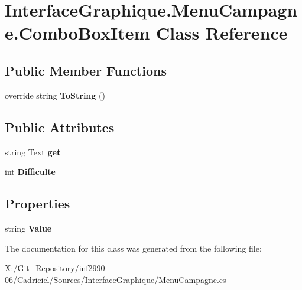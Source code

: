 \hypertarget{class_interface_graphique_1_1_menu_campagne_1_1_combo_box_item}{\section{Interface\-Graphique.\-Menu\-Campagne.\-Combo\-Box\-Item Class Reference}
\label{class_interface_graphique_1_1_menu_campagne_1_1_combo_box_item}
}
\subsection*{Public Member Functions}
\begin{DoxyCompactItemize}
\item 
\hypertarget{class_interface_graphique_1_1_menu_campagne_1_1_combo_box_item_ae18b58ca549af71043b57edffd6cfa6f}{override string {\bfseries To\-String} ()}\label{class_interface_graphique_1_1_menu_campagne_1_1_combo_box_item_ae18b58ca549af71043b57edffd6cfa6f}

\end{DoxyCompactItemize}
\subsection*{Public Attributes}
\begin{DoxyCompactItemize}
\item 
\hypertarget{class_interface_graphique_1_1_menu_campagne_1_1_combo_box_item_a6ca0abfd516a8df4faf602c9303319ea}{string Text {\bfseries get}}\label{class_interface_graphique_1_1_menu_campagne_1_1_combo_box_item_a6ca0abfd516a8df4faf602c9303319ea}

\item 
\hypertarget{class_interface_graphique_1_1_menu_campagne_1_1_combo_box_item_a044d419a44ff271f53a7e7f006064f4c}{int {\bfseries Difficulte}}\label{class_interface_graphique_1_1_menu_campagne_1_1_combo_box_item_a044d419a44ff271f53a7e7f006064f4c}

\end{DoxyCompactItemize}
\subsection*{Properties}
\begin{DoxyCompactItemize}
\item 
\hypertarget{class_interface_graphique_1_1_menu_campagne_1_1_combo_box_item_af32e2bf5eed166e54ce322627482cbff}{string {\bfseries Value}}\label{class_interface_graphique_1_1_menu_campagne_1_1_combo_box_item_af32e2bf5eed166e54ce322627482cbff}

\end{DoxyCompactItemize}


The documentation for this class was generated from the following file\-:\begin{DoxyCompactItemize}
\item 
X\-:/\-Git\-\_\-\-Repository/inf2990-\/06/\-Cadriciel/\-Sources/\-Interface\-Graphique/Menu\-Campagne.\-cs\end{DoxyCompactItemize}
